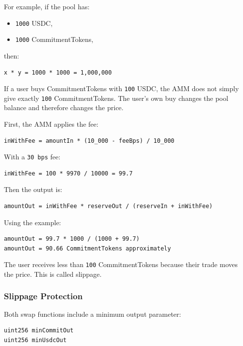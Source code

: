 \documentclass[11pt,a4paper]{article}
\begin{document}
For example, if the pool has:

\begin{itemize}
  \item \texttt{1000} USDC,
  \item \texttt{1000} CommitmentTokens,
\end{itemize}

then:

\begin{lstlisting}
x * y = 1000 * 1000 = 1,000,000
\end{lstlisting}

If a user buys CommitmentTokens with \texttt{100} USDC, the AMM does not simply give exactly \texttt{100} CommitmentTokens. The user's own buy changes the pool balance and therefore changes the price.

First, the AMM applies the fee:

\begin{lstlisting}
inWithFee = amountIn * (10_000 - feeBps) / 10_000
\end{lstlisting}

With a \texttt{30 bps} fee:

\begin{lstlisting}
inWithFee = 100 * 9970 / 10000 = 99.7
\end{lstlisting}

Then the output is:

\begin{lstlisting}
amountOut = inWithFee * reserveOut / (reserveIn + inWithFee)
\end{lstlisting}

Using the example:

\begin{lstlisting}
amountOut = 99.7 * 1000 / (1000 + 99.7)
amountOut = 90.66 CommitmentTokens approximately
\end{lstlisting}

The user receives less than \texttt{100} CommitmentTokens because their trade moves the price. This is called slippage.

\subsubsection{Slippage Protection}

Both swap functions include a minimum output parameter:

\begin{lstlisting}
uint256 minCommitOut
uint256 minUsdcOut
\end{lstlisting}
\end{document}
